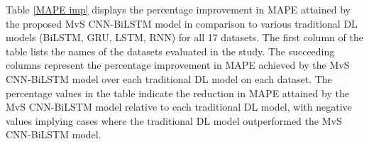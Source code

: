 \documentclass[a4paper,fleqn]{cas-sc}
\begin{document}
    Table \ref{MAPE imp} displays the percentage improvement in MAPE attained by the proposed MvS CNN-BiLSTM model in comparison to various traditional DL models (BiLSTM, GRU, LSTM, RNN) for all 17 datasets. The first column of the table lists the names of the datasets evaluated in the study. The succeeding columns represent the percentage improvement in MAPE achieved by the MvS CNN-BiLSTM model over each traditional DL model on each dataset. The percentage values in the table indicate the reduction in MAPE attained by the MvS CNN-BiLSTM model relative to each traditional DL model, with negative values implying cases where the traditional DL model outperformed the MvS CNN-BiLSTM model.

\end{document}

